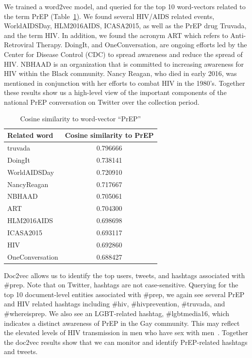 \documentclass[conference]{IEEEtran}
\begin{document}
We trained a word2vec model, and queried for the top 10 word-vectors related to the term PrEP (Table~\ref{tbl:w2v}). We found several HIV/AIDS related events, WorldAIDSDay, HLM2016AIDS, ICASA2015, as well as the PrEP drug Truvada, and the term HIV. In addition, we found the acronym ART which refers to Anti-Retroviral Therapy. DoingIt, and OneConversation, are ongoing efforts led by the Center for Disease Control (CDC) to spread awareness and reduce the spread of HIV. NBHAAD is an organization that is committed to increasing awareness for HIV within the Black community. Nancy Reagan, who died in early 2016, was mentioned in conjunction with her efforts to combat HIV in the 1980's. Together these results show us a high-level view of the important components of the national PrEP conversation on Twitter over the collection period.

\begin{table}
\centering
\caption{Cosine similarity to word-vector ``PrEP''}
\begin{tabular}{|l|c|} \hline
Related word & Cosine similarity to PrEP\\ \hline
truvada & 0.796666\\ \hline
DoingIt & 0.738141\\ \hline
WorldAIDSDay & 0.720910\\ \hline
NancyReagan & 0.717667\\ \hline
NBHAAD & 0.705061\\ \hline
ART & 0.704300\\ \hline
HLM2016AIDS & 0.698698\\ \hline
ICASA2015 & 0.693117\\ \hline
HIV & 0.692860\\ \hline
OneConversation & 0.688427\\ \hline
\hline\end{tabular}
\label{tbl:w2v}
\end{table}

Doc2vec allows us to identify the top users, tweets, and hashtags associated with \#prep. Note that on Twitter, hashtags are not case-sensitive. Querying for the top 10 document-level entities associated with \#prep, we again see several PrEP and HIV related hashtags including \#hiv, \#hivprevention, \#truvada, and \#whereisprep. We also see an LGBT-related hashtag, \#lgbtmedia16, which indicates a distinct awareness of PrEP in the Gay community. This may reflect the elevated levels of HIV transmission in men who have sex with men~\cite{centers2014hiv}. Together the doc2vec results show that we can monitor and identify PrEP-related hashtags and tweets.
\end{document}
